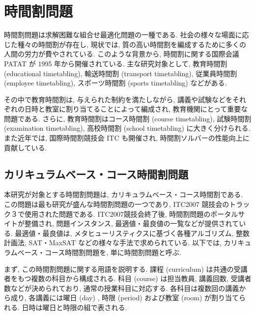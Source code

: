 \chapter{時間割問題}

時間割問題は求解困難な組合せ最適化問題の一種である. 社会の様々な場面に応じた種々の時間割が存在し, 現状では, 質の高い時間割を編成するために多くの人間の労力が費やされている. このような背景から, 時間割に関する国際会議 PATAT が 1995 年から開催されている. 主な研究対象として, 教育時間割  (educational timetabling), 輸送時間割 (transport timetabling), 従業員時間割 (employee timetabling), スポーツ時間割 (sports timetabling) などがある.

その中で教育時間割は, 与えられた制約を満たしながら, 講義や試験などをそれぞれの日時と教室に割り当てることによって編成され, 教育機関にとって重要な問題である. さらに, 教育時間割はコース時間割 (course timetabling), 試験時間割 (examination timetabling), 高校時間割 (school timetabling) に大きく分けられる. また近年では, 国際時間割競技会 ITC も開催され, 時間割ソルバーの性能向上に貢献している.

\section{カリキュラムベース・コース時間割問題}

本研究が対象とする時間割問題は, カリキュラムベース・コース時間割である. この問題は最も研究が盛んな時間割問題の一つであり, ITC2007 競技会のトラック３で使用された問題である. ITC2007競技会終了後, 時間割問題のポータルサイトが整備され, 問題インスタンス, 最適値・最良値の一覧などが提供されている. 最適値・最良値は, メタヒューリスティクスに基づく各種アルゴリズム, 整数計画法, SAT・MaxSAT などの様々な手法で求められている. 以下では, カリキュラムベース・コース時間割問題を, 単に時間割問題と呼ぶ.

まず, この時間割問題に関する用語を説明する. 課程 (curriculum) は共通の受講者をもつ複数の科目から構成される. 科目 (course) は担当教員, 講義回数, 受講者数などが決められており, 通常の授業科目に対応する. 各科目は複数回の講義から成り, 各講義には曜日 (day) , 時限 (period) および教室 (room) が割り当てられる. 日時は曜日と時限の組で表される.




